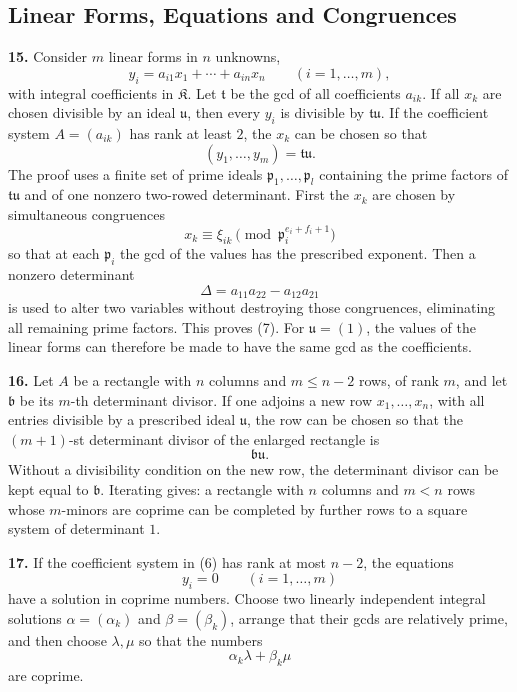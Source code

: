 \documentclass[11pt,a4paper]{article}
\newcommand{\K}{\mathfrak K}
\begin{document}
\subsection*{Linear Forms, Equations and Congruences}

\textbf{15.} Consider \(m\) linear forms in \(n\) unknowns,
\[
 y_i=a_{i1}x_1+\cdots+a_{in}x_n\qquad(i=1,\ldots,m), \tag{6}
\]
with integral coefficients in \(\K\). Let \(\mathfrak t\) be the gcd of all coefficients \(a_{ik}\). If all \(x_k\) are chosen divisible by an ideal \(\mathfrak u\), then every \(y_i\) is divisible by \(\mathfrak t\mathfrak u\). If the coefficient system \(A=(a_{ik})\) has rank at least \(2\), the \(x_k\) can be chosen so that
\[
 (y_1,\ldots,y_m)=\mathfrak t\mathfrak u. \tag{7}
\]
The proof uses a finite set of prime ideals \(\mathfrak p_1,\ldots,\mathfrak p_l\) containing the prime factors of \(\mathfrak t\mathfrak u\) and of one nonzero two-rowed determinant. First the \(x_k\) are chosen by simultaneous congruences
\[
 x_k\equiv \xi_{ik}\pmod{\mathfrak p_i^{e_i+f_i+1}}
\]
so that at each \(\mathfrak p_i\) the gcd of the values has the prescribed exponent. Then a nonzero determinant
\[
 \Delta=a_{11}a_{22}-a_{12}a_{21}
\]
is used to alter two variables without destroying those congruences, eliminating all remaining prime factors. This proves (7). For \(\mathfrak u=(1)\), the values of the linear forms can therefore be made to have the same gcd as the coefficients.

\textbf{16.} Let \(A\) be a rectangle with \(n\) columns and \(m\leq n-2\) rows, of rank \(m\), and let \(\mathfrak b\) be its \(m\)-th determinant divisor. If one adjoins a new row \(x_1,\ldots,x_n\), with all entries divisible by a prescribed ideal \(\mathfrak u\), the row can be chosen so that the \((m+1)\)-st determinant divisor of the enlarged rectangle is
\[
 \mathfrak b\mathfrak u.
\]
Without a divisibility condition on the new row, the determinant divisor can be kept equal to \(\mathfrak b\). Iterating gives: a rectangle with \(n\) columns and \(m<n\) rows whose \(m\)-minors are coprime can be completed by further rows to a square system of determinant \(1\).

\textbf{17.} If the coefficient system in (6) has rank at most \(n-2\), the equations
\[
 y_i=0\qquad(i=1,\ldots,m)
\]
have a solution in coprime numbers. Choose two linearly independent integral solutions \(\alpha=(\alpha_k)\) and \(\beta=(\beta_k)\), arrange that their gcds are relatively prime, and then choose \(\lambda,\mu\) so that the numbers
\[
 \alpha_k\lambda+\beta_k\mu
\]
are coprime.
\end{document}
